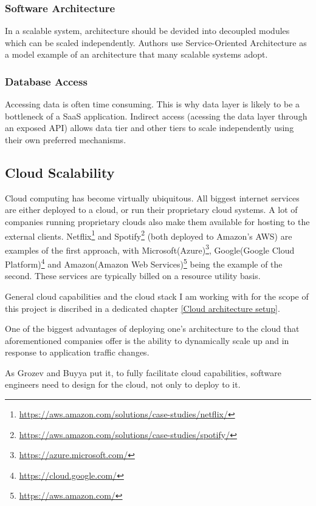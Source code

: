 \documentclass{uvamscse}
\begin{document}
\subsubsection{Software Architecture}
In a scalable system, architecture should be devided into decoupled modules which can be scaled independently. Authors \cite{WeiTek} use Service-Oriented Architecture as a model example of an architecture that many scalable systems adopt.

\subsubsection{Database Access}
Accessing data is often time consuming. This is why data layer is likely to be a bottleneck of a SaaS application. Indirect access (acessing the data layer through an exposed API) allows data tier and other tiers to scale independently using their own preferred mechanisms.

\subsection{Cloud Scalability}\label{Cloud Scalability}
Cloud computing has become virtually ubiquitous. All biggest internet services are either deployed to a cloud, or run their proprietary cloud systems. A lot of companies running proprietary clouds also make them available for hosting to the external clients. Netflix\footnote{\url{https://aws.amazon.com/solutions/case-studies/netflix/}} and Spotify\footnote{\url{https://aws.amazon.com/solutions/case-studies/spotify/}} (both deployed to Amazon's AWS) are examples of the first approach, with Microsoft(Azure)\footnote{\url{https://azure.microsoft.com/}}, Google(Google Cloud Platform)\footnote{\url{https://cloud.google.com/}} and Amazon(Amazon Web Services)\footnote{\url{https://aws.amazon.com/}} being the example of the second. These services are typically billed on a resource utility basis.

General cloud capabilities and the cloud stack I am working with for the scope of this project is discribed in a dedicated chapter \ref{Cloud architecture setup}.

One of the biggest advantages of deploying one's architecture to the cloud that aforementioned companies offer is the ability to dynamically scale up and in response to application traffic changes.

As Grozev and Buyya \cite{GroBuy} put it, to fully facilitate cloud capabilities, software engineers need to design for the cloud, not only to deploy to it.
\end{document}
